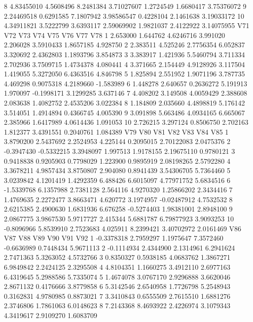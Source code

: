 \documentclass[12pt]{article}
\begin{document}
\begin{Schunk}
\begin{Soutput}
8   4.83455010 4.5608496 8.2481384 3.71027607 1.2724549  1.6680417  3.75376072
9   2.24469518 0.6291585 7.1807942 3.98586547 0.4228104  2.1461638  3.19033172
10  4.34911821 3.5222799 3.6393117 2.59069902 1.9821037  2.4122922  3.14075955
        V71      V72       V73      V74      V75        V76       V77       V78
1  2.653000 1.644762 4.6246716 3.991020 2.206028  3.5910433 1.8657185  4.928750
2  2.383511 4.525246 2.7756354 6.052837 3.320692  2.4362803 1.1893796  3.854873
3  3.383917 1.421936 5.5460794 3.711334 2.702936  3.7509715 1.4734378  4.080441
4  3.371665 2.154449 4.9128926 3.117504 1.419055  5.3272050 6.4363516  4.846798
5  1.825894 2.551952 1.9071196 3.787735 4.469298  0.9075318 4.2189660 -1.583989
6  1.448278 2.640657 0.2636272 5.191913 1.970097 -0.1998171 3.1299285  3.637146
7  4.408202 3.149508 4.0059429 2.388608 2.083638  1.4082752 2.4535206  3.022384
8  1.184809 2.035660 4.4898819 5.176142 3.514051  1.4914894 0.4366745  4.005390
9  3.091898 5.663486 4.0934165 6.665067 2.385966  1.6417989 4.0614436  1.091053
10 2.726215 3.297124 0.8506750 2.702163 1.812377  3.4391551 0.2040761  1.084389
          V79        V80       V81      V82        V83         V84       V85
1   3.8790200  2.5437692 2.2524953 4.225144  0.2095015  2.70122083 2.0475376
2  -0.3947430 -0.5332215 3.3948097 1.997513  1.9178155  2.19675110 0.9780121
3   0.9418838  0.9205903 0.7798029 1.223900  0.9895919  2.08198265 2.5792280
4   3.3678211  4.9857434 3.8750807 2.904080  0.8941439  3.54306705 5.7364460
5   3.0239842  4.1201419 1.4292359 6.488426  6.6015097  4.77971752 5.6834516
6  -1.5339768  6.1357988 2.7381128 2.564116  4.9270320  1.25866202 2.3434416
7   1.4769635  2.2272477 3.8663471 4.620772  3.1974957 -0.02487912 4.7532532
8   2.6215385  2.4900630 1.6831936 6.676258 -0.5274403  1.98381001 2.8948100
9   2.0867775  3.9867530 5.9717727 2.415344  5.6881787  6.79877923 3.9093253
10 -0.8096966  5.8539910 2.7523683 4.025911  8.2399421  3.40702972 2.0161469
          V86       V87       V88       V89        V90       V91       V92
1  -0.3378318 2.7959297 1.1975647 7.3572460 -0.6636989 0.7448434 5.9671113
2  -0.1114934 2.4344900 2.1314961 6.2941624  2.7471363 5.3263052 4.5732766
3   0.8350327 0.5938185 4.0683762 1.3867271  6.9849842 2.2424125 2.3295508
4   4.8104351 1.1660275 3.4912110 2.6977163  6.4319645 5.2988586 5.7335074
5   1.4674078 3.0767170 2.9296888 3.6620046  2.8671132 0.4176666 3.8779858
6   5.3142546 2.6540958 1.7726798 5.2548943  0.3162831 4.9780985 0.8873021
7   3.3410843 0.6555509 2.7615510 1.6881276  2.3746806 1.7861063 6.0148623
8   7.2143368 8.4693922 2.4226974 3.1079343  4.3419617 2.9109270 1.6083709

\end{Soutput}
\end{Schunk}
\end{document}
